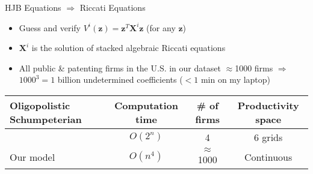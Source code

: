 \documentclass[
  10pt,               %
  aspectratio=169,     %
]{beamer}
\theoremstyle{plain}
\begin{document}
%
\begin{frame}{HJB Equations $\Longrightarrow$ Riccati Equations}

  \label{hjb}
  \begin{itemize}
    \item Guess and verify $V^{i}\left(\bm{z}\right)=\bm{z}^{T}\bm{X}^{i}\bm{z}$
          (for any $\bm{z}$) \medskip{}
    \item $\bm{X}^{i}$ is the solution of stacked algebraic Riccati equations

          \hyperlink{riccati}{}\medskip{}\pause
    \item All public \& patenting firms in the U.S. in our dataset $\approx$1000
          firms $\Longrightarrow$ \\
          $1000^{3}=1$ billion undetermined coefficients ($< 1$ min on my laptop)\medskip{}
  \end{itemize}
  \begin{center}
    \begin{tabular}{@{}p{5cm}ccc@{}}
      \toprule
      Oligopolistic Schumpeterian & Computation time & \# of firms   & Productivity space \\
      \midrule
      \citet{Cavenaile2023-lo}    & $O(2^n)$         & 4             & 6 grids            \\
      Our model                   & $O(n^4)$         & $\approx$1000 & Continuous         \\
      \bottomrule
    \end{tabular}
  \end{center}

\end{frame}
%
\end{document}
